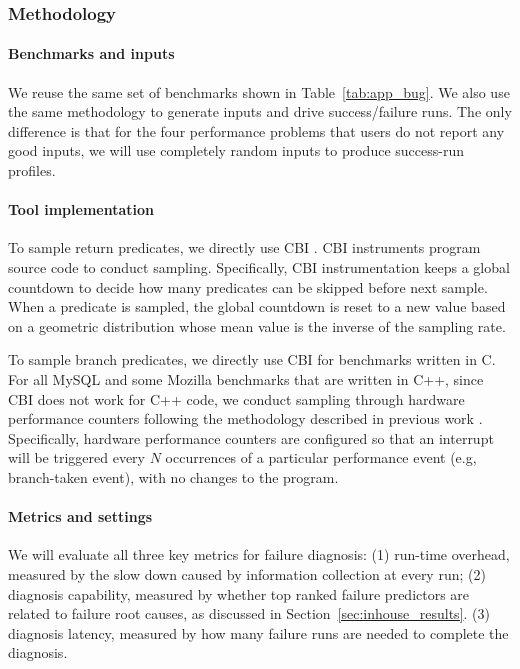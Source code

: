 \subsubsection{Methodology}
\paragraph{Benchmarks and inputs}
We reuse the same set of benchmarks shown in Table~\ref{tab:app_bug}. 
We also use the same methodology to generate inputs and drive success/failure
runs. The only difference is that for the four performance problems that users
do not report any good inputs, we will use completely random inputs to produce
success-run profiles.

\paragraph{Tool implementation}
To sample return predicates, we directly use CBI \citep{liblit03,liblit05}.
CBI instruments program source code to conduct sampling.
Specifically, CBI instrumentation keeps a global countdown to decide how many 
predicates can be skipped before next sample. 
When a predicate is sampled, 
the global countdown is reset to a new value based on a geometric distribution 
whose mean value is the inverse of the sampling rate. 

To sample branch predicates, we directly use CBI for benchmarks written in 
C. For all MySQL and some Mozilla benchmarks that are written in C++, since
CBI does not work for C++ code, we conduct sampling through
hardware performance counters following the
methodology described in previous work \citep{joy.asplos13}.
Specifically, hardware performance
counters are configured so that an interrupt will be triggered every $N$
occurrences of a particular performance event (e.g, branch-taken event), with no changes to the program.

\paragraph{Metrics and settings}
We will evaluate all three key metrics for failure diagnosis:
(1) run-time overhead, measured by the slow down caused by information
collection at every run;
(2) diagnosis capability,
measured by whether top ranked failure predictors are 
related to failure root causes, as discussed in 
Section~\ref{sec:inhouse_results}.
(3) diagnosis latency,
measured by how many failure runs are needed 
to complete the diagnosis. 

